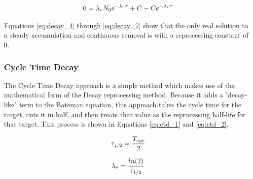 \begin{equation} \hfill
0 = \lambda_r N_0 e^{-\lambda_r \tau} + C - C e^{-\lambda_r \tau}
\hfill\label{eq:decay_7} \end{equation}


 Equations \eqref{eq:decay_4} through \eqref{eq:decay_7} show that the only real solution to a steady accumulation and continuous removal is with a reprocessing constant of 0. 

\subsubsection{Cycle Time Decay}

The Cycle Time Decay approach is a simple method which makes use of the mathematical form of the Decay reprocessing method. Because it adds a "decay-like" term to the Bateman equation, this approach takes the cycle time for the target, cuts it in half, and then treats that value as the reprocessing half-life for that target. This process is shown in Equations \eqref{eq:ctd_1} and \eqref{eq:ctd_2}.

\begin{equation} \hfill
\tau_{1/2} = \frac{T_{cyc}}{2}
\hfill\label{eq:ctd_1} \end{equation}

\begin{equation} \hfill
\lambda_r = \frac{ln(2)}{\tau_{1/2}}
\hfill\label{eq:ctd_2} \end{equation}





